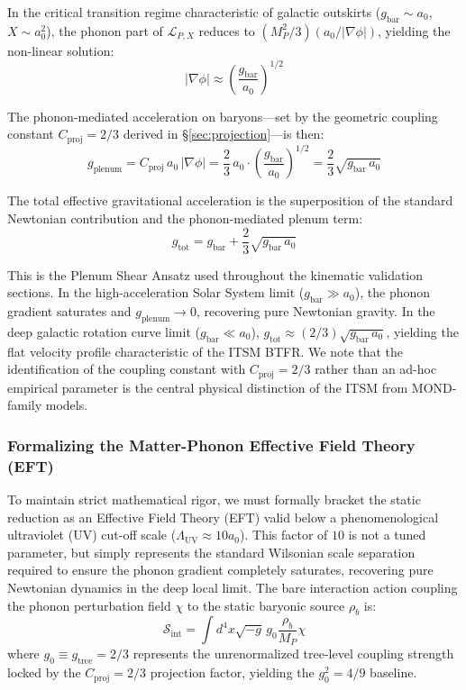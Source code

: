 \documentclass[aps,prd,10pt,twocolumn,superscriptaddress,nofootinbib,floatfix]{revtex4-2}
\begin{document}
In the critical transition regime characteristic of galactic outskirts ($g_{\text{bar}} \sim a_0$, $X \sim a_0^2$), the phonon part of $\mathcal{L}_{P,X}$ reduces to $(M_P^2/3)(a_0/|\nabla\phi|)$, yielding the non-linear solution:
\begin{equation}
|\nabla\phi| \approx \left(\frac{g_{\text{bar}}}{a_0}\right)^{1/2}
\end{equation}

The phonon-mediated acceleration on baryons---set by the geometric coupling constant $C_{\text{proj}} = 2/3$ derived in \S\ref{sec:projection}---is then:
\begin{equation}
g_{\text{plenum}} = C_{\text{proj}}\,a_0\,|\nabla\phi| = \frac{2}{3}\,a_0 \cdot \left(\frac{g_{\text{bar}}}{a_0}\right)^{1/2} = \frac{2}{3}\sqrt{g_{\text{bar}}\,a_0}
\end{equation}

The total effective gravitational acceleration is the superposition of the standard Newtonian contribution and the phonon-mediated plenum term:
\begin{equation}
g_{\text{tot}} = g_{\text{bar}} + \frac{2}{3}\sqrt{g_{\text{bar}}\,a_0}
\end{equation}

This is the Plenum Shear Ansatz used throughout the kinematic validation sections. In the high-acceleration Solar System limit ($g_{\text{bar}} \gg a_0$), the phonon gradient saturates and $g_{\text{plenum}} \to 0$, recovering pure Newtonian gravity. In the deep galactic rotation curve limit ($g_{\text{bar}} \ll a_0$), $g_{\text{tot}} \approx (2/3)\sqrt{g_{\text{bar}}\,a_0}$, yielding the flat velocity profile characteristic of the ITSM BTFR. We note that the identification of the coupling constant with $C_{\text{proj}} = 2/3$ rather than an ad-hoc empirical parameter is the central physical distinction of the ITSM from MOND-family models. \subsubsection{Formalizing the Matter-Phonon Effective Field Theory (EFT)}
To maintain strict mathematical rigor, we must formally bracket the static reduction as an Effective Field Theory (EFT) valid below a phenomenological ultraviolet (UV) cut-off scale ($\Lambda_{\text{UV}} \approx 10 a_0$). This factor of $10$ is not a tuned parameter, but simply represents the standard Wilsonian scale separation required to ensure the phonon gradient completely saturates, recovering pure Newtonian dynamics in the deep local limit. The bare interaction action coupling the phonon perturbation field $\chi$ to the static baryonic source $\rho_b$ is:
\begin{equation}
\mathcal{S}_{\text{int}} = \int d^4x \sqrt{-g} \, g_0 \frac{\rho_b}{M_P} \chi
\end{equation}
where $g_0 \equiv g_{\text{tree}} = 2/3$ represents the unrenormalized tree-level coupling strength locked by the $C_{\text{proj}} = 2/3$ projection factor, yielding the $g_0^2 = 4/9$ baseline.
\end{document}
